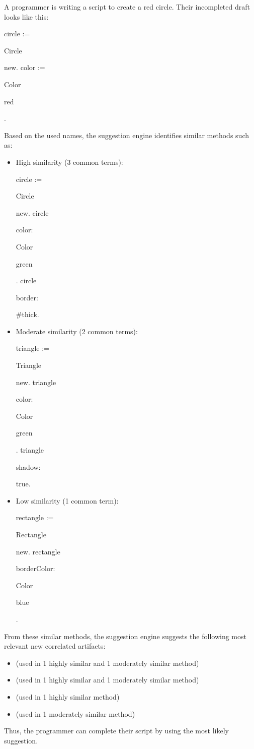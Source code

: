 
\begin{example}
	A programmer is writing a script to create a red circle.
	Their incompleted draft looks like this:
	\newcommand*\interm[1]{\setlength{\fboxsep}{0pt}\colorbox{intermbasecolor!30}{\strut{}#1}}
	\newcommand*\coterm[1]{\setlength{\fboxsep}{0pt}\colorbox{red!30}{\strut{}#1}}
	\let\oldmulticode\multicode \let\endoldmulticode\endmulticode
	\RenewDocumentEnvironment{multicode}{}{\setlength{\baselineskip}{1em}\oldmulticode}{\endoldmulticode}
	\begin{multicode}
		circle := \interm{Circle} new. \n
		color := \interm{Color} \interm{red}.
	\end{multicode}
	Based on the used names, the suggestion engine identifies similar methods such as:
	\begin{itemize}
		\item High similarity (3 common terms):
		\begin{multicode}
			circle := \interm{Circle} new. \n
			circle \coterm{color:} \interm{Color} \coterm{green}. \n
			circle \coterm{border:} \#thick.
		\end{multicode}
		\item Moderate similarity (2 common terms):
		\begin{multicode}
			triangle := \coterm{Triangle} new. \n
			triangle \coterm{color:} \interm{Color} \coterm{green}. \n
			triangle \coterm{shadow:} true.
		\end{multicode}
		\item Low similarity (1 common term):
		\begin{multicode}
			rectangle := \coterm{Rectangle} new. \n
			rectangle \coterm{borderColor:} \interm{Color} \coterm{blue}.
		\end{multicode}
	\end{itemize}
	From these similar methods, the suggestion engine suggests the following most relevant new correlated artifacts:
	\begin{itemize}
		\item {} (used in 1 highly similar and 1 moderately similar
		method)
		\item {} (used in 1 highly similar and 1 moderately similar
		method)
		\item {} (used in 1 highly similar method)
		\item {} (used in 1 moderately similar method)
	\end{itemize}
	Thus, the programmer can complete their script by using the most likely suggestion.
\end{example}
